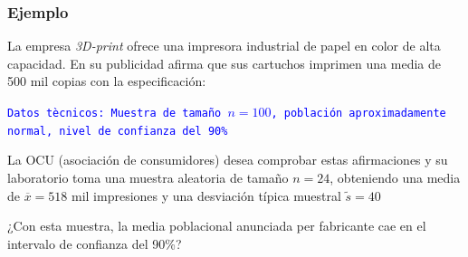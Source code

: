 \documentclass[12pt,t]{beamer}\usepackage[]{graphicx}\usepackage[]{color}
\newcommand{\blue}[1]{\textcolor{blue}{#1}}
\theoremstyle{plain}
\theoremstyle{definition}
\begin{document}
%
%
%
%
%
%
%
%
%




\begin{frame}
\frametitle{Ejemplo}

La empresa \textsl{3D-print} ofrece una impresora industrial de papel en color de alta capacidad. En su publicidad afirma que sus cartuchos imprimen una media de 500 mil copias con la especificación: 
\medskip

\blue{\texttt{Datos tècnicos: Muestra de  tamaño  $n=100$,
población aproximadamente normal, nivel de confianza  del 90\%}}
\medskip 

La OCU (asociación de consumidores) desea comprobar estas  afirmaciones y su laboratorio toma una muestra aleatoria de  tamaño  $n=24$, obteniendo una media   de $\overline{x}=518$ mil impresiones y una desviación típica muestral $\widetilde{s}=40$
\medskip

¿Con esta muestra, la media   poblacional anunciada per fabricante cae en el  intervalo de confianza  del 90\%?
\end{frame}
\end{document}
